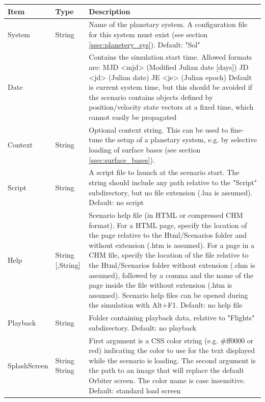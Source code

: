 \documentclass[Orbiter Developer Manual.tex]{subfiles}
\begin{document}
\begin{table}[H]
	\centering
	\begin{tabularx}{\textwidth}{ |l|l|X| }
	\hline\rule{0pt}{2ex}
	\textbf{Item} & \textbf{Type} & \textbf{Description}\\
	\hline\rule{0pt}{2ex}
	System & String & Name of the planetary system. A configuration file for this system must exist (see section \ref{ssec:planetery_sys}). Default: "Sol"\\
	\hline\rule{0pt}{2ex}
	Date &   & Contains the simulation start time. Allowed formats are:\newline
	MJD <mjd> (Modified Julian date [days])\newline
	JD <jd> (Julian date)\newline
	JE <je> (Julian epoch)\newline
	Default is current system time, but this should be avoided if the scenario contains objects defined by position/velocity  state vectors at a fixed time, which cannot easily be propagated\\
	\hline\rule{0pt}{2ex}
	Context & String & Optional context string. This can be used to fine-tune the setup of a planetary system, e.g. by selective loading of surface bases (see section \ref{ssec:surface_bases}).\\
	\hline\rule{0pt}{2ex}
	Script & String & A script file to launch at the scenario start. The string should include any path relative to the "Script" subdirectory, but no file extension (.lua is assumed). Default: no script\\
	\hline\rule{0pt}{2ex}
	Help & String [,String] & Scenario help file (in HTML or compressed CHM format). For a HTML page, specify the location of the page relative to the Html/Scenarios folder and without extension (.htm is assumed). For a page in a CHM file, specify the location of the file relative to the Html/Scenarios folder without extension (.chm is assumed), followed by a comma and the name of the page inside the file without extension (.htm is assumed). Scenario help files can be opened during the simulation with Alt+F1. Default: no help file\\
	\hline\rule{0pt}{2ex}
	Playback & String & Folder containing playback data, relative to "Flights" subdirectory. Default: no playback\\
	\hline\rule{0pt}{2ex}
	SplashScreen & String String & First argument is a CSS color string (e.g. \#ff0000 or red) indicating the color to use for the text displayed while the scenario is loading. The second argument is the path to an image that will replace the default Orbiter screen. The color name is case insensitive. Default: standard load screen\\
	\hline
	\end{tabularx}
\end{table}
\end{document}
